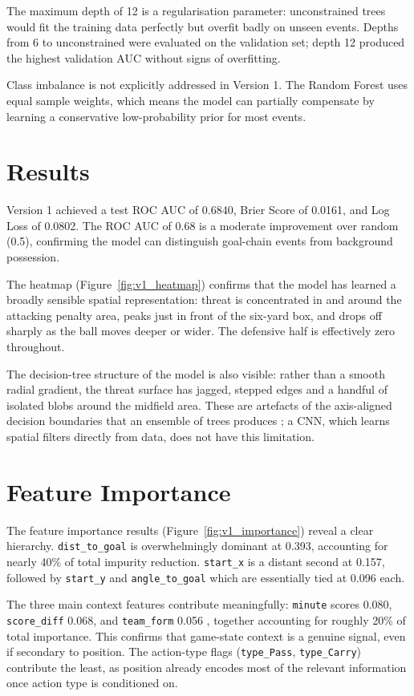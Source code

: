 The maximum depth of 12 is a regularisation parameter: unconstrained trees would fit the training data perfectly but overfit badly on unseen events. Depths from 6 to unconstrained were evaluated on the validation set; depth 12 produced the highest validation AUC without signs of overfitting.

Class imbalance is not explicitly addressed in Version 1. The Random Forest uses equal sample weights, which means the model can partially compensate by learning a conservative low-probability prior for most events.

\section{Results}\label{sec:v1_results}

Version 1 achieved a test ROC AUC of 0.6840, Brier Score of 0.0161, and Log Loss of 0.0802. The ROC AUC of 0.68 is a moderate improvement over random (0.5), confirming the model can distinguish goal-chain events from background possession. 

The heatmap (Figure~\ref{fig:v1_heatmap}) confirms that the model has learned a broadly sensible spatial representation: threat is concentrated in and around the attacking penalty area, peaks just in front of the six-yard box, and drops off sharply as the ball moves deeper or wider. The defensive half is effectively zero throughout.

The decision-tree structure of the model is also visible: rather than a smooth radial gradient, the threat surface has jagged, stepped edges and a handful of isolated blobs around the midfield area. These are artefacts of the axis-aligned decision boundaries that an ensemble of trees produces ; a CNN, which learns spatial filters directly from data, does not have this limitation.

\section{Feature Importance}\label{sec:v1_importance}

The feature importance results (Figure~\ref{fig:v1_importance}) reveal a clear hierarchy. \texttt{dist\_to\_goal} is overwhelmingly dominant at 0.393, accounting for nearly 40\% of total impurity reduction. \texttt{start\_x} is a distant second at 0.157, followed by \texttt{start\_y} and \texttt{angle\_to\_goal} which are essentially tied at 0.096 each.

The three main context features contribute meaningfully: \texttt{minute} scores 0.080, \texttt{score\_diff} 0.068, and \texttt{team\_form} 0.056 , together accounting for roughly 20\% of total importance. This confirms that game-state context is a genuine signal, even if secondary to position. The action-type flags (\texttt{type\_Pass}, \texttt{type\_Carry}) contribute the least, as position already encodes most of the relevant information once action type is conditioned on.

